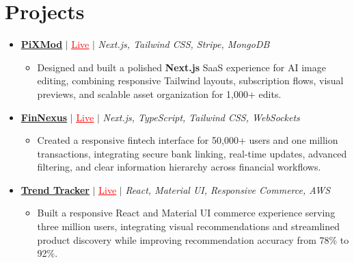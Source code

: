 \documentclass[letterpaper,10pt]{article}
\newcommand{\resumeItem}[1]{\item\small{{#1 \vspace{-3pt}}}}
\newcommand{\resumeProjectHeading}[1]{\item \small #1 \vspace{-2pt}}
\newcommand{\resumeProjectLink}[2]{\href{#1}{\textcolor{red}{\underline{#2}}}}
\newcommand{\resumeSubHeadingListStart}{\begin{itemize}[leftmargin=0.0in,label={}]}
\newcommand{\resumeSubHeadingListEnd}{\end{itemize}}
\newcommand{\resumeProjItemListStart}{\begin{itemize}[leftmargin=0.15in,label=\textbullet,itemsep=0pt,topsep=0pt,parsep=0pt,partopsep=0pt]}
\newcommand{\resumeProjItemListEnd}{\end{itemize}\vspace{1pt}}
\begin{document}
\section{Projects}
\resumeSubHeadingListStart
  \resumeProjectHeading{\href{https://pixmod.vercel.app/}{\textbf{PiXMod}} $|$ \resumeProjectLink{https://pixmod.vercel.app/}{Live} $|$ \emph{Next.js, Tailwind CSS, Stripe, MongoDB}}
  \resumeProjItemListStart
    \resumeItem{Designed and built a polished \textbf{Next.js} SaaS experience for AI image editing, combining responsive Tailwind layouts, subscription flows, visual previews, and scalable asset organization for 1,000+ edits.}
  \resumeProjItemListEnd
  \resumeProjectHeading{\href{https://fin-nexus.vercel.app/}{\textbf{FinNexus}} $|$ \resumeProjectLink{https://fin-nexus.vercel.app/}{Live} $|$ \emph{Next.js, TypeScript, Tailwind CSS, WebSockets}}
  \resumeProjItemListStart
    \resumeItem{Created a responsive fintech interface for 50,000+ users and one million transactions, integrating secure bank linking, real-time updates, advanced filtering, and clear information hierarchy across financial workflows.}
  \resumeProjItemListEnd
  \resumeProjectHeading{\href{https://www.vastrado.com/}{\textbf{Trend Tracker}} $|$ \resumeProjectLink{https://www.vastrado.com/}{Live} $|$ \emph{React, Material UI, Responsive Commerce, AWS}}
  \resumeProjItemListStart
    \resumeItem{Built a responsive React and Material UI commerce experience serving three million users, integrating visual recommendations and streamlined product discovery while improving recommendation accuracy from 78\% to 92\%.}
  \resumeProjItemListEnd
\resumeSubHeadingListEnd
\end{document}
